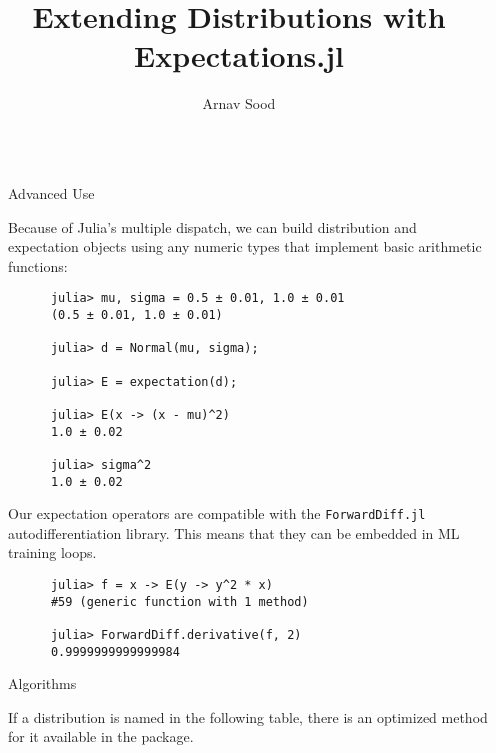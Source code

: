 \documentclass[final]{beamer}
\title{Extending Distributions with Expectations.jl \textt{}}
\author{Arnav Sood \inst{1}}
\institute[shortinst]{\inst{1} Vancovuer School of Economics, University of British Columbia}
\newlength{\sepwidth}
\newlength{\colwidth}
\newcommand{\separatorcolumn}{\begin{column}{\sepwidth}\end{column}}
\begin{document}
\begin{frame}[fragile]
\begin{columns}[t]
\separatorcolumn

\begin{column}{\colwidth}

  \begin{block}{Advanced Use}


    Because of Julia's multiple dispatch, we can build distribution and expectation objects using any numeric types that implement basic arithmetic functions:

    \begin{verbatim}
      julia> mu, sigma = 0.5 ± 0.01, 1.0 ± 0.01
      (0.5 ± 0.01, 1.0 ± 0.01)
      
      julia> d = Normal(mu, sigma);
      
      julia> E = expectation(d);
      
      julia> E(x -> (x - mu)^2)
      1.0 ± 0.02
      
      julia> sigma^2
      1.0 ± 0.02
    \end{verbatim}
    Our expectation operators are compatible with the \texttt{ForwardDiff.jl} autodifferentiation library. This means that they can be embedded in ML training loops.

    \begin{verbatim}
      julia> f = x -> E(y -> y^2 * x)
      #59 (generic function with 1 method)

      julia> ForwardDiff.derivative(f, 2)
      0.9999999999999984
    \end{verbatim}
  \end{block}

  \begin{block}{Algorithms}

    If a distribution is named in the following table, there is an optimized method for it available in the package. 


\end{block}
\end{column}
\end{columns}
\end{frame}
\end{document}
